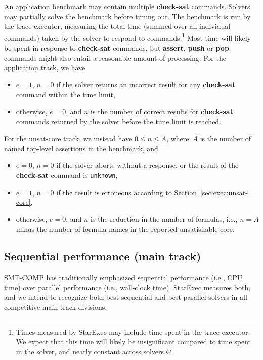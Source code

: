 \documentclass[12pt]{article}
\newcommand{\akey}[1]{\textbf{#1}}
\begin{document}
%
An application benchmark may contain multiple \akey{check-sat}
commands.  Solvers may partially solve the benchmark before timing
out.  The benchmark is run by the trace executor, measuring the total
time (summed over all individual commands) taken by the solver to
respond to commands.\footnote{Times measured by StarExec may include
  time spent in the trace executor.  We expect that this time will
  likely be insignificant compared to time spent in the solver, and
  nearly constant across solvers.}  Most time will likely be spent in
response to \akey{check-sat} commands, but \akey{assert}, \akey{push}
or \akey{pop} commands might also entail a reasonable amount of
processing.  For the application track, we have
\begin{itemize}
\item $e=1$, $n=0$ if the solver returns an incorrect result for any
  \akey{check-sat} command within the time limit,
\item otherwise, $e=0$, and $n$ is the number of correct results for
  \akey{check-sat} commands returned by the solver before the time
  limit is reached.
\end{itemize}

%
For the unsat-core track, we instead have $0 \leq n \leq A$, where~$A$
is the number of named top-level assertions in the benchmark, and
\begin{itemize}
\item $e=0$, $n=0$ if the solver aborts without a response, or the
  result of the \akey{check-sat} command is \texttt{unknown},
\item $e=1$, $n=0$ if the result is erroneous according to
  Section~\ref{sec:exec:unsat-core},
\item otherwise, $e=0$, and $n$ is the reduction in the number of
  formulas, i.e., $n = A$ minus the number of formula names in the
  reported unsatisfiable core.
\end{itemize}

\subsection{Sequential performance (main track)}
\label{sec:sequential}

SMT-COMP has traditionally emphasized sequential performance (i.e.,
CPU time) over parallel performance (i.e., wall-clock time).  StarExec
measures both, and we intend to recognize both best sequential and
best parallel solvers in all competitive main track divisions.
\end{document}
